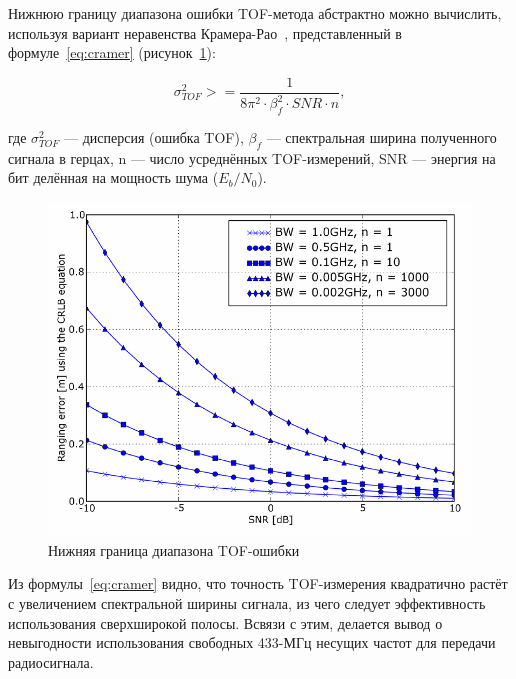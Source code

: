 Нижнюю границу диапазона ошибки TOF-метода абстрактно можно вычислить, используя вариант неравенства Крамера-Рао~\cite{radiofreq:tof}, представленный в формуле~\eqref{eq:cramer} (рисунок~\ref{fig:cramer}):

\begin{equation}
    \label{eq:cramer}
    \sigma^2_{TOF} >= \frac{1}{8\pi^2 \cdot \beta^2_f \cdot SNR \cdot n},
\end{equation}

где $\sigma^2_{TOF}$ --- дисперсия (ошибка TOF), $\beta_f$ --- спектральная ширина полученного сигнала в герцах, n --- число усреднённых TOF-измерений, SNR --- энергия на бит делённая на мощность шума ($E_b/N_0$).

\begin{figure}[ht]
    \includegraphics[width=.7\linewidth]{Figures/cramer.png}
    \caption{Нижняя граница диапазона TOF-ошибки}
    \label{fig:cramer}
\end{figure}

Из формулы~\eqref{eq:cramer} видно, что точность TOF-измерения квадратично растёт с увеличением спектральной ширины сигнала, из чего следует эффективность использования сверхширокой полосы. Всвязи с этим, делается вывод о невыгодности использования свободных 433-МГц несущих частот для передачи радиосигнала.
